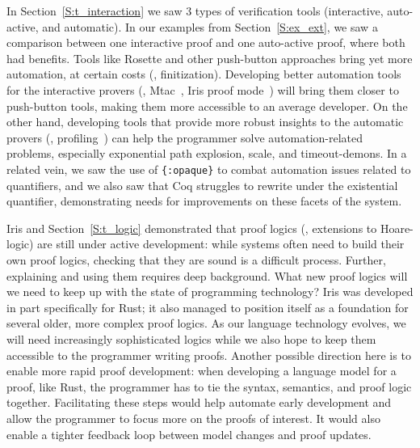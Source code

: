 In Section~\ref{S:t_interaction} we saw 3 types of verification tools
(interactive, auto-active, and automatic). In our examples from
Section~\ref{S:ex_ext}, we saw a comparison between one interactive proof and
one auto-active proof, where both had benefits. Tools like Rosette and other
push-button approaches bring yet more automation, at certain costs (\eg,
finitization). Developing better automation tools for the interactive provers
(\eg, Mtac~\cite{Kaiser_2018}, Iris proof mode~\cite{Krebbers_2017b}) will bring
them closer to push-button tools, making them more accessible to an average
developer. On the other hand, developing tools that provide more robust insights
to the automatic provers (\eg,
profiling~\cite{Bornholt_2018,Porncharoenwase_2020}) can help the programmer
solve automation-related problems, especially exponential path explosion, scale,
and timeout-demons. In a related vein, we saw the use of \texttt{\{:opaque\}} to
combat automation issues related to quantifiers, and we also saw that Coq
struggles to rewrite under the existential quantifier, demonstrating needs for
improvements on these facets of the system.

Iris and Section~\ref{S:t_logic} demonstrated that proof logics (\eg, extensions
to Hoare-logic) are still under active development: while systems often need to
build their own proof logics, checking that they are sound is a difficult
process. Further, explaining and using them requires deep background. What new
proof logics will we need to keep up with the state of programming technology?
Iris was developed in part specifically for Rust; it also managed to position
itself as a foundation for several older, more complex proof logics. As our
language technology evolves, we will need increasingly sophisticated logics
while we also hope to keep them accessible to the programmer writing proofs.
Another possible direction here is to enable more rapid proof development:
when developing a language model for a proof, like Rust, the programmer has to
tie the syntax, semantics, and proof logic together. Facilitating these steps
would help automate early development and allow the programmer to focus
more on the proofs of interest. It would also enable a tighter feedback loop
between model changes and proof updates.

